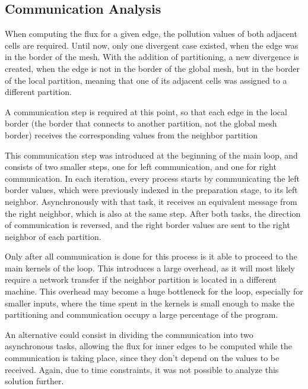 \subsection{Communication Analysis}
\label{subsec:mpi:comm}


When computing the flux for a given edge, the pollution values of both adjacent cells are required.
Until now, only one divergent case existed, when the edge was in the border of the mesh.
With the addition of partitioning, a new divergence is created, when the edge is not in the border of the global mesh, but in the border of the local partition, meaning that one of its adjacent cells was assigned to a different partition.

A communication step is required at this point, so that each edge in the local border (the border that connects to another partition, not the global mesh border) receives the corresponding values from the neighbor partition 

This communication step was introduced at the beginning of the main loop, and consists of two smaller steps, one for left communication, and one for right communication.
In each iteration, every process starts by communicating the left border values, which were previously indexed in the preparation stage, to its left neighbor.
Asynchronously with that task, it receives an equivalent message from the right neighbor, which is also at the same step.
After both tasks, the direction of communication is reversed, and the right border values are sent to the right neighbor of each partition.

Only after all communication is done for this process is it able to proceed to the main kernels of the loop. This introduces a large overhead, as it will most likely require a network transfer if the neighbor partition is located in a different machine.
This overhead may become a huge bottleneck for the loop, especially for smaller inputs, where the time spent in the kernels is small enough to make the partitioning and communication occupy a large percentage of the program.

An alternative could consist in dividing the communication into two asynchronous tasks, allowing the flux for inner edges to be computed while the communication is taking place, since they don't depend on the values to be received. Again, due to time constraints, it was not possible to analyze this solution further.
